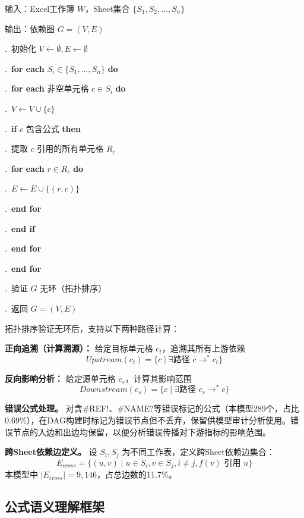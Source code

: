 {
\noindent 输入：Excel工作簿 $W$，Sheet集合 $\{S_1, S_2, \ldots, S_n\}$

\noindent 输出：依赖图 $G=(V, E)$

.\ 初始化 $V \leftarrow \emptyset, E \leftarrow \emptyset$

.\ \textbf{for each} $S_i \in \{S_1, \ldots, S_n\}$ \textbf{do}

.\ \quad \textbf{for each} 非空单元格 $c \in S_i$ \textbf{do}

.\ \quad \quad $V \leftarrow V \cup \{c\}$

.\ \quad \quad \textbf{if} $c$ 包含公式 \textbf{then}

.\ \quad \quad \quad 提取 $c$ 引用的所有单元格 $R_c$

.\ \quad \quad \quad \textbf{for each} $r \in R_c$ \textbf{do}

.\ \quad \quad \quad \quad $E \leftarrow E \cup \{(r, c)\}$

.\ \quad \quad \quad \textbf{end for}

.\ \quad \textbf{end if}

.\ \textbf{end for}

.\ \textbf{end for}

.\ 验证 $G$ 无环（拓扑排序）

.\ 返回 $G=(V, E)$}

拓扑排序验证无环后，支持以下两种路径计算：

\textbf{正向追溯（计算溯源）：} 给定目标单元格 $c_t$，追溯其所有上游依赖
$$\mathit{Upstream}(c_t) = \{c \mid \exists \text{路径 } c \to^* c_t\}$$

\textbf{反向影响分析：} 给定源单元格 $c_s$，计算其影响范围
$$\mathit{Downstream}(c_s) = \{c \mid \exists \text{路径 } c_s \to^* c\}$$

\textbf{错误公式处理。} 对含\#REF!、\#NAME?等错误标记的公式（本模型289个，占比0.69\%），在DAG构建时标记为错误节点但不丢弃，保留供模型审计分析使用。错误节点的入边和出边均保留，以便分析错误传播对下游指标的影响范围。

\textbf{跨Sheet依赖边定义。} 设 $S_i, S_j$ 为不同工作表，定义跨Sheet依赖边集合：
$$E_{\mathit{cross}} = \{(u, v) \mid u \in S_i, v \in S_j, i \neq j, f(v) \text{ 引用 } u\}$$
本模型中 $|E_{\mathit{cross}}| = 9,146$，占总边数的11.7\%。

\subsection{\heiti 公式语义理解框架}

